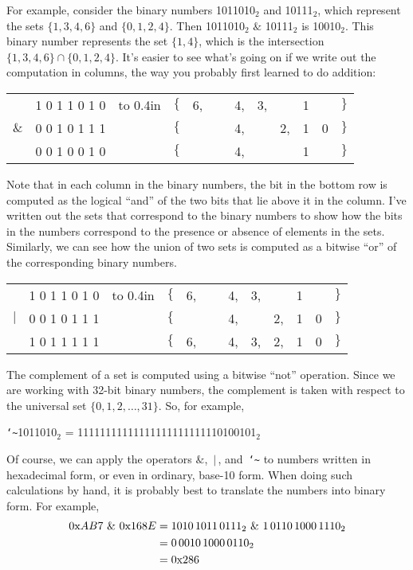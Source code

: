 For example, consider the binary numbers 1011010$_2$ and
10111$_2$, which represent the sets $\{1,3,4,6\}$ and
$\{0,1,2,4\}$.  Then 1011010$_2$ $\&$ 10111$_2$ is
10010$_2$.  This binary number represents the set $\{1,4\}$,
which is the intersection $\{1,3,4,6\}\cap\{0,1,2,4\}$.
It's easier to see what's going on if we write out the
computation in columns, the way you probably first learned to
do addition:
\begin{center}
\begin{tabular}{rrrrrrrrrrrr}
       &1 0 1 1 0 1 0&\hbox to 0.4in{}& $\{$&6, &\ &4, &3, &   &1  & &$\}$\\
 $\&$  &0 0 1 0 1 1 1&                & $\{$&   &\ &4, &   &2, &1\rlap{,} &0&$\}$\\ \cline{2-2}\cline{4-12}
 \strut&0 0 1 0 0 1 0&                & $\{$&   &  &4, &   &   &1  & &$\}$
\end{tabular}
\end{center}
Note that in each column in the binary numbers, the bit in the
bottom row is computed as the logical ``and'' of the two bits
that lie above it in the column.  I've written out the sets that
correspond to the binary numbers to show how the bits in the
numbers correspond  to the presence or absence of elements in the sets.
Similarly, we can see how the union of two sets is computed as
a bitwise ``or'' of the corresponding binary numbers.
\begin{center}
\begin{tabular}{rrrrrrrrrrrr}
       &1 0 1 1 0 1 0&\hbox to 0.4in{}& $\{$&6, &\ &4, &3, &   &1  & &$\}$\\
 $|$   &0 0 1 0 1 1 1&                & $\{$&   &\ &4, &   &2, &1\rlap{,} &0&$\}$\\ \cline{2-2}\cline{4-12}
 \strut&1 0 1 1 1 1 1&                & $\{$&6, &  &4, &3, &2, &1\rlap{,}  &0&$\}$
\end{tabular}
\end{center}
The complement of a set is computed using a bitwise ``not'' operation.
Since we are working with 32-bit binary numbers, the complement is
taken with respect to the universal set $\{0,1,2,\dots,31\}$.
So, for example, 
\begin{center}
\texttt{\char`\~}1011010$_2$ = 11111111111111111111111110100101$_2$
\end{center}
Of course, we can apply the operators $\&$, $\,|\,$, and~\texttt{\char`\~}
to numbers written in hexadecimal form, or even in ordinary, base-10
form.  When doing such calculations by hand, it is probably best
to translate the numbers into binary form.  For example,
\begin{align*}
0\hbox{x}AB7\ \&\ 0\hbox{x}168E &= 1010\,1011\,0111_2\ \&\ 1\,0110\,1000\,1110_2\\
                &= 0\,0010\,1000\,0110_2\\
                &= 0\hbox{x}286
\end{align*}

